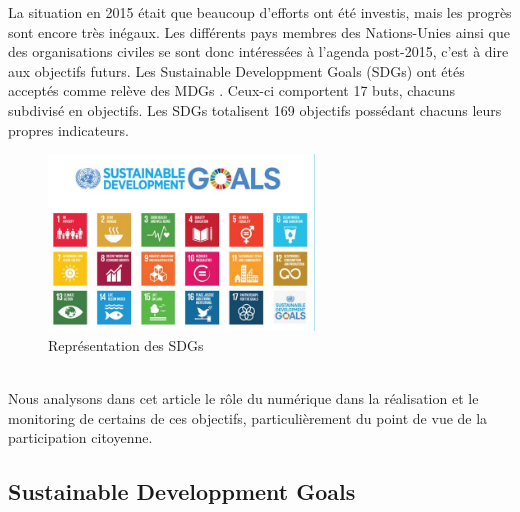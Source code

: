 \documentclass[10pt, conference, compsocconf]{llncs}
\begin{document}
	La situation en 2015 était que beaucoup d'efforts ont été investis, mais les progrès sont encore très inégaux. Les différents pays membres des Nations-Unies ainsi que des organisations civiles se sont donc intéressées à l'agenda post-2015, c'est à dire aux objectifs futurs. Les Sustainable Developpment Goals (SDGs) ont étés acceptés comme relève des MDGs \cite{wikipedia_sustainable_2017}. Ceux-ci comportent 17 buts, chacuns subdivisé en objectifs. Les SDGs totalisent 169 objectifs possédant chacuns leurs propres indicateurs.
	\begin{figure}
		\begin{center}
			\includegraphics[width=200pt]{sdgs.jpg}
		\end{center}
		\caption{Représentation des SDGs}
	\end{figure}
	\\
	Nous analysons dans cet article le rôle du numérique dans la réalisation et le monitoring de certains de ces objectifs, particulièrement du point de vue de la participation citoyenne.

	\subsection{Sustainable Developpment Goals}
\end{document}
